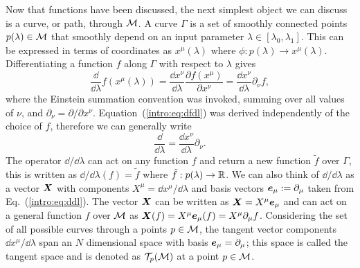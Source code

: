 Now that functions have been discussed, the next simplest object we can discuss is a curve, or path, through $\mathcal{M}$. A curve $\Gamma$ is a set of smoothly connected points $p(\lambda)\in \mathcal{M}$ that smoothly depend on an input parameter $\lambda \in [\lambda_0,\lambda_1]$. This can be expressed in terms of coordinates as $x^\mu(\lambda)$ where $\phi:p(\lambda) \rightarrow x^\mu(\lambda)$. Differentiating a function $f$ along $\Gamma$ with respect to $\lambda$ gives
\begin{equation} \label{intro:eq:dfdl}
\frac{\dd}{\dd \lambda}f(x^\mu(\lambda)) = \frac{\dd x^\nu}{\dd \lambda}\frac{\partial f(x^\mu)}{\partial x^\nu} = \frac{\dd x^\nu}{\dd \lambda}\partial_\nu f,
\end{equation}
where the Einstein summation convention was invoked, summing over all values of $\nu$, and $\partial_\nu = {\partial}/{\partial x^\nu}$. Equation~(\ref{intro:eq:dfdl}) was derived independently of the choice of $f$, therefore we can generally write
\begin{equation} \label{intro:eq:ddl}
\frac{\dd}{\dd \lambda} = \frac{\dd x^\nu}{\dd \lambda}\partial_\nu.
\end{equation}
The operator $\dd/\dd \lambda $ can act on any function $f$ and return a new function $\tilde{f}$ over $\Gamma$, this is written as $\dd/\dd \lambda (f) = \tilde{f}$ where $\tilde{f}:p(\lambda)\rightarrow \mathbb{R}$. We can also think of $\dd/\dd \lambda$ as a vector $\boldsymbol{X}$ with components $X^\mu=\dd x^\mu / \dd \lambda$ and basis vectors $\boldsymbol{e}_\mu:=\partial_\mu$ taken from Eq.~(\ref{intro:eq:ddl}). The vector $\boldsymbol{X}$ can be written as $\boldsymbol{X} = X^\mu \boldsymbol{e}_\mu$ and can act on a general function $f$ over $\mathcal{M}$ as $\boldsymbol{X}(f) = X^\mu \boldsymbol{e}_\mu(f) = X^\mu \partial_\mu f$. Considering the set of all possible curves through a points $p\in\mathcal{M}$, the tangent vector components $\dd x^\mu / \dd \lambda$ span an $N$ dimensional space with basis $\boldsymbol{e}_\mu = \partial_\mu$; this space is called the tangent space and is denoted as $\mathcal{T}_p(\mathcal{M})$ at a point $p\in\mathcal{M}$.

